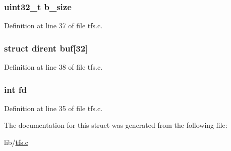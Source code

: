 \subsubsection[{b\+\_\+size}]{\setlength{\rightskip}{0pt plus 5cm}uint32\+\_\+t b\+\_\+size}\label{struct___d_i_r_a74a107b6ecf6720b85be3ab754ebb91d}


Definition at line 37 of file tfs.\+c.

\hypertarget{struct___d_i_r_a70aca33069c63d89b270ba5e4cf2e552}{}
\subsubsection[{buf}]{\setlength{\rightskip}{0pt plus 5cm}struct {\bf dirent} buf\mbox{[}32\mbox{]}}\label{struct___d_i_r_a70aca33069c63d89b270ba5e4cf2e552}


Definition at line 38 of file tfs.\+c.

\hypertarget{struct___d_i_r_a6f8059414f0228f0256115e024eeed4b}{}
\subsubsection[{fd}]{\setlength{\rightskip}{0pt plus 5cm}int fd}\label{struct___d_i_r_a6f8059414f0228f0256115e024eeed4b}


Definition at line 35 of file tfs.\+c.



The documentation for this struct was generated from the following file\+:\begin{DoxyCompactItemize}
\item 
lib/\hyperlink{tfs_8c}{tfs.\+c}\end{DoxyCompactItemize}
